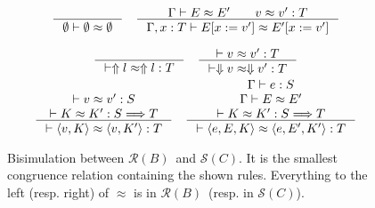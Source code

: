 \documentclass[runningheads]{llncs}
\newcommand{\infr}[2]{\inference{#1}{#2}}
\newcommand{\RMachine}[1]{\ensuremath{\mathcal{R}(#1)}}
\newcommand{\RBMachine}[0]{\RMachine{B}}
\newcommand{\SMachine}[1]{\ensuremath{\mathcal{S}(#1)}}
\newcommand{\error}[1]{\ensuremath{\Uparrow#1}}
\newcommand{\ecast}[2]{\ensuremath{#1 : #2}}
\newcommand{\ccast}[3]{#1 \xRightarrow[]{\enskip #2 \enskip} #3}
\newcommand{\sexpr}[3]{\ensuremath{\langle#1,#2,#3\rangle}}
\newcommand{\scont}[2]{\ensuremath{\langle#1,#2\rangle}}
\newcommand{\shalt}[1]{\ensuremath{\Downarrow #1}}
\newcommand{\Kcons}[2]{[#1]#2}
\newcommand{\Fcast}[1]{\ecast{\square}{#1}}
\newcommand{\compose}[2]{\ensuremath{#1 \fatsemi #2}}
\newcommand{\translate}[1]{\ensuremath{\lceil#1\rceil}}
\newcommand{\expressiontyping}[3]{\ensuremath{#1 \vdash #2 : #3}}
\newcommand{\valuetyping}[2]{\ensuremath{\vdash #1 : #2}}
\newcommand{\casttyping}[3]{\ensuremath{\vdash #1 : #2 \Longrightarrow #3}}
\newcommand{\bisimE}[3]{\ensuremath{#1 \vdash #2 \approx #3}}
\newcommand{\bisimv}[3]{\valuetyping{#1 \approx #2}{#3}}
\newcommand{\bisimc}[4]{\casttyping{#1 \approx #2}{#3}{#4}}
\newcommand{\bisimK}[4]{\casttyping{#1 \approx #2}{#3}{#4}}
\newcommand{\bisims}[3]{\valuetyping{\ensuremath{#1 \approx #2}}{#3}}
\begin{document}
\begin{figure}
\fbox{\bisimE{\Gamma}{E}{E}}
\begin{gather*}
\inference{
}{
	\bisimE{\emptyset}{\emptyset}{\emptyset}
}
\quad
\inference{
	\Gamma \vdash E \approx E' \qquad
	v \approx v' : T
}{
	\Gamma , x : T \vdash 
	E [ x := v' ] \approx E' [ x := v' ]
}
\end{gather*}

\fbox{\bisims{s}{s}{T}}
\begin{gather*}
\infr{}{\bisims{\error{l}}{\error{l}}{T}} \quad
\infr{
	\bisimv{v}{v'}{T}
}{
	\bisims{\shalt{v}}{\shalt{v'}}{T}
}
\\
\infr{
	\bisimv{v}{v'}{S} \\
	\bisimK{K}{K'}{S}{T}
}{
	\bisims{\scont{v}{K}}{\scont{v}{K'}}{T}
} \quad
\infr{
	\expressiontyping{\Gamma}{e}{S} \\
	\bisimE{\Gamma}{E}{E'}          \\
	\bisimK{K}{K'}{S}{T}
}{
	\bisims{\sexpr{e}{E}{K}}{\sexpr{e}{E'}{K'}}{T}
}
\end{gather*}

\caption{Bisimulation between \RBMachine\ and \SMachine{C}. It is the smallest 
congruence relation containing the shown rules. Everything to the left (resp. 
right) of $\approx$ is in \RBMachine\ (resp. in \SMachine{C}).}
\label{fig:bisim-SC-D}
\end{figure}



\end{document}
